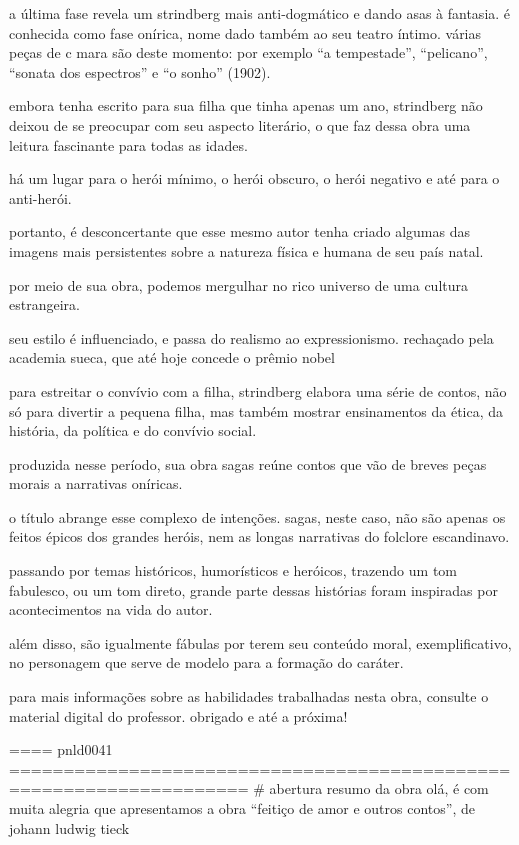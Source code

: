 a última fase revela um strindberg mais anti-dogmático e dando asas à fantasia. é conhecida como fase onírica, nome dado também ao seu teatro íntimo. várias peças de c mara são deste momento: por exemplo “a tempestade”, “pelicano”, “sonata dos espectros” e “o sonho” (1902).


embora tenha escrito para sua filha que tinha apenas um ano, strindberg não deixou de se preocupar com seu aspecto literário, o que faz dessa obra uma leitura fascinante para todas as idades.

há um lugar para o herói mínimo, o herói obscuro, o herói negativo e até para o anti-herói.

portanto, é desconcertante que esse mesmo autor tenha criado algumas das imagens mais persistentes sobre a natureza física e humana de seu país natal.

por meio de sua obra, podemos mergulhar no rico universo de uma cultura estrangeira.


seu estilo é influenciado, e passa do realismo ao expressionismo. rechaçado pela academia sueca, que até hoje concede o prêmio nobel

para estreitar o convívio com a filha, strindberg elabora uma série de contos, não só para divertir a pequena filha, mas também mostrar ensinamentos da ética, da história, da política e do convívio social.

produzida nesse período, sua obra sagas reúne contos que vão de breves peças morais a narrativas oníricas.

o título abrange esse complexo de intenções. sagas, neste caso, não são apenas os feitos épicos dos grandes heróis, nem as longas narrativas do folclore escandinavo.

passando por temas históricos, humorísticos e heróicos, trazendo um tom fabulesco, ou um tom direto, grande parte dessas histórias foram inspiradas por acontecimentos na vida do autor.

além disso, são igualmente fábulas por terem seu conteúdo moral, exemplificativo, no personagem que serve de modelo para a formação do caráter.



para mais informações sobre as habilidades trabalhadas nesta obra, consulte o material digital do professor. obrigado e até a próxima!


==== pnld0041 ====================================================================
# abertura resumo da obra
olá, 
é com muita alegria que apresentamos a obra “feitiço de amor e outros contos”, de johann ludwig tieck

